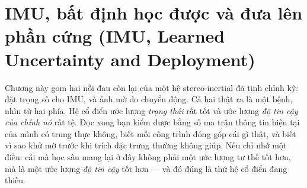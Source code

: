 \documentclass[../../deep_learning.tex]{subfiles}
\begin{document}
\chapter{IMU, bất định học được và đưa lên phần cứng (IMU, Learned Uncertainty and Deployment)}

\begin{tomtat}
Chương này gom hai nỗi đau còn lại của một hệ stereo-inertial đã tinh chỉnh kỹ: đặt trọng số cho IMU, và ảnh mờ do chuyển động. Cả hai thật ra là một bệnh, nhìn từ hai phía. Hệ cổ điển ước lượng \emph{trạng thái} rất tốt và ước lượng \emph{độ tin cậy của chính nó} rất tệ. Đọc xong bạn kiểm được bằng số ma trận thông tin hiện tại của mình có trung thực không, biết mỗi công trình đóng góp cái gì thật, và biết vì sao khử mờ trước khi trích đặc trưng thường không giúp. Nếu chỉ nhớ một điều: cái mà học sâu mang lại ở đây không phải một ước lượng tư thế tốt hơn, mà là một ước lượng \emph{độ tin cậy} tốt hơn --- và đó đúng là thứ hệ cổ điển đang thiếu.
\end{tomtat}
\end{document}
